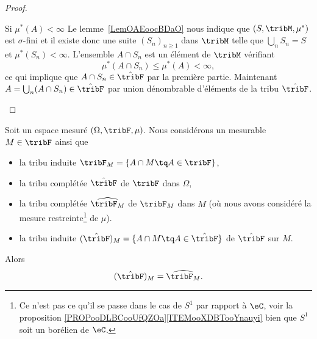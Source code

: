 \begin{proof}
\begin{subproof}
    \item[Si \( \mu^*(A)<\infty\)]
        Le lemme~\ref{LemOAEoocBDaO} nous indique que \( (S,\tribM,\mu^*)\) est \( \sigma\)-fini et il existe donc une suite \( (S_n)_{n\geq 1}\) dans \( \tribM\) telle que \( \bigcup_nS_n=S\) et \( \mu^*(S_n)<\infty\). L'ensemble \( A\cap S_n\) est un élément de \( \tribM\) vérifiant
        \begin{equation}
            \mu^*(A\cap S_n)\leq \mu^*(A)<\infty,
        \end{equation}
        ce qui implique que \( A\cap S_n\in\hat\tribF\) par la première partie. Maintenant \( A=\bigcup_n(A\cap S_n)\in\hat\tribF\) par union dénombrable d'éléments de la tribu \( \hat\tribF\).
    \end{subproof}
\end{proof}

\begin{proposition} \label{PROPooAMIEooRomnMG}
    Soit un espace mesuré \( (\Omega,\tribF,\mu)\). Nous considérons un mesurable \( M\in \tribF\) ainsi que
    \begin{itemize}
        \item
            la tribu induite    \( \tribF_M=\{ A\cap M\tq A\in \tribF \}\),
        \item
            la tribu complétée  \( \hat\tribF\) de \( \tribF\) dans \( \Omega\),
        \item
            la tribu complétée  \( \widehat{\tribF_M}\) de \( \tribF_M\) dans \( M\) (où nous avons considéré la mesure restreinte\footnote{Ce n'est pas ce qu'il se passe dans le cas de \( S^1\) par rapport à \( \eC\), voir la proposition \ref{PROPooDLBCooUfQZOa}\ref{ITEMooXDBTooYnauyi} bien que \( S^1\) soit un borélien de \( \eC\).} de \( \mu\)).
        \item
            la tribu induite    \( (\hat\tribF)_M=\{ A\cap M\tq A\in \hat\tribF \}\) de \( \hat\tribF\) sur \( M\).
    \end{itemize}
    Alors
    \begin{equation}
        (\hat\tribF)_M=\widehat{\tribF_M}.
    \end{equation}
\end{proposition}


